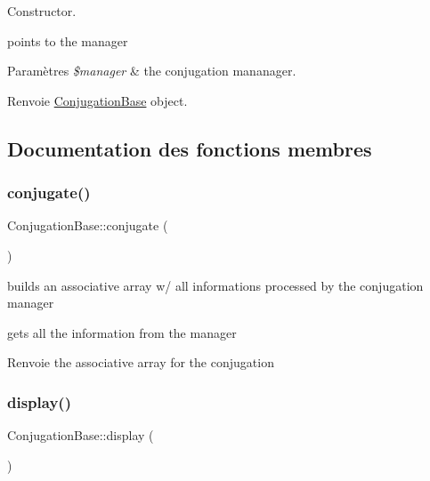 Constructor. 

points to the manager


\begin{DoxyParams}{Paramètres}
{\em \$manager} & the conjugation mananager. \\
\hline
\end{DoxyParams}
\begin{DoxyReturn}{Renvoie}
\hyperlink{classConjugationBase}{Conjugation\+Base} object. 
\end{DoxyReturn}


\subsection{Documentation des fonctions membres}
\hypertarget{classConjugationBase_a8137cfd9e8f57dafedd5cc724d57b9e6}{}\label{classConjugationBase_a8137cfd9e8f57dafedd5cc724d57b9e6} 
\subsubsection{\texorpdfstring{conjugate()}{conjugate()}}
{\footnotesize\ttfamily Conjugation\+Base\+::conjugate (\begin{DoxyParamCaption}{ }\end{DoxyParamCaption})}



builds an associative array w/ all informations processed by the conjugation manager 

gets all the information from the manager

\begin{DoxyReturn}{Renvoie}
the associative array for the conjugation 
\end{DoxyReturn}
\hypertarget{classConjugationBase_a7a50c953a3f949a7740d3fb51c4b929d}{}\label{classConjugationBase_a7a50c953a3f949a7740d3fb51c4b929d} 
\subsubsection{\texorpdfstring{display()}{display()}}
{\footnotesize\ttfamily Conjugation\+Base\+::display (\begin{DoxyParamCaption}{ }\end{DoxyParamCaption})\hspace{0.3cm}{\ttfamily [abstract]}}

